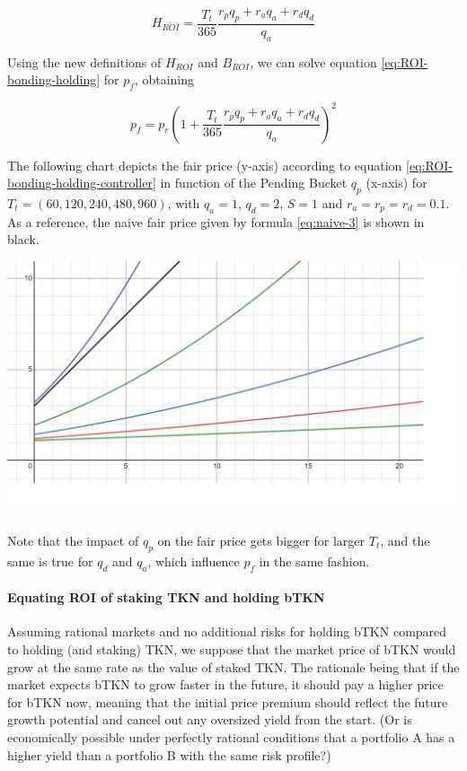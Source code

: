 \documentclass{article}
\begin{document}
\begin{equation}
  \label{eq:HROI-controller}
    H_{ROI} = \frac{T_t}{365} \frac{r_p q_p + r_a q_a + r_d q_d}{q_a}
\end{equation} 

Using the new definitions of $H_{ROI}$ and $B_{ROI}$, we can solve equation \ref{eq:ROI-bonding-holding} for $p_f$, obtaining

\begin{equation}
  \label{eq:ROI-bonding-holding-controller}
  p_f = p_r\left(1 + \frac{T_t}{365} \frac{r_p q_p + r_a q_a + r_d q_d}{q_a}\right)^2 
\end{equation}

The following chart depicts the fair price (y-axis) according to equation \ref{eq:ROI-bonding-holding-controller} in function of the Pending Bucket $q_p$ (x-axis) for $T_t=(60, 120, 240, 480, 960)$, with $q_a=1$, $q_d=2$, $S=1$ and $r_a=r_p=r_d=0.1$.
As a reference, the naive fair price given by formula \ref{eq:naive-3} is shown in black.

\includegraphics[width=\linewidth]{./ChickenBonds_Whitepaper_controller_price.png}

Note that the impact of $q_p$ on the fair price gets bigger for larger $T_t$, and the same is true for $q_d$ and $q_a$, which influence $p_f$ in the same fashion.

\paragraph{Equating ROI of staking TKN and holding bTKN}
Assuming rational markets and no additional risks for holding bTKN compared to holding (and staking) TKN, we suppose that the market price of bTKN would grow at the same rate as the value of staked TKN. The rationale being that if the market expects bTKN to grow faster in the future, it should pay a higher price for bTKN now, meaning that the initial price premium should reflect the future growth potential and cancel out any oversized yield from the start. (Or is economically possible under perfectly rational conditions that a portfolio A has a higher yield than a portfolio B with the same risk profile?)
\end{document}
